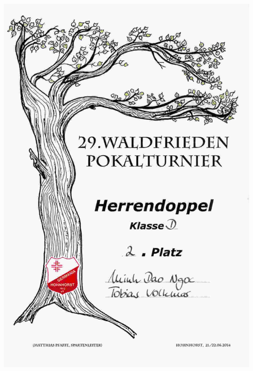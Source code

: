 \documentclass[12pt,a4paper]{scrartcl}
\begin{document}
\newpage
\includegraphics[width=\linewidth, height=\textheight]
{./zeugnisse/29_waldfrieden_pokalturnier_urkunde_lq.jpg}

\end{document}
